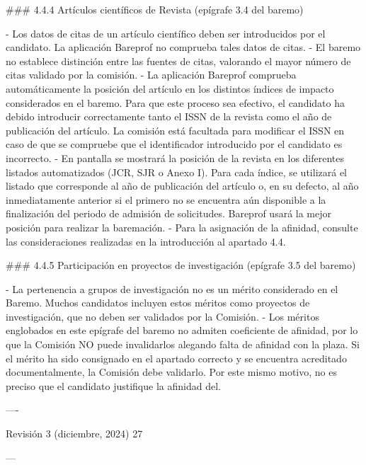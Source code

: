 \documentclass{article}
\begin{document}
\begin{itemize}
\begin{itemize}
\begin{scriptsize}
                  \#\#\# 4.4.4 Artículos científicos de Revista (epígrafe 3.4 del baremo)

                  - Los datos de citas de un artículo científico deben ser introducidos por el candidato. La aplicación Bareprof no comprueba tales datos de citas.
                  - El baremo no establece distinción entre las fuentes de citas, valorando el mayor número de citas validado por la comisión.
                  - La aplicación Bareprof comprueba automáticamente la posición del artículo en los distintos índices de impacto considerados en el baremo. Para que este proceso sea efectivo, el candidato ha debido introducir correctamente tanto el ISSN de la revista como el año de publicación del artículo. La comisión está facultada para modificar el ISSN en caso de que se compruebe que el identificador introducido por el candidato es incorrecto.
                  - En pantalla se mostrará la posición de la revista en los diferentes listados automatizados (JCR, SJR o Anexo I). Para cada índice, se utilizará el listado que corresponde al año de publicación del artículo o, en su defecto, al año inmediatamente anterior si el primero no se encuentra aún disponible a la finalización del periodo de admisión de solicitudes. Bareprof usará la mejor posición para realizar la baremación.
                  - Para la asignación de la afinidad, consulte las consideraciones realizadas en la introducción al apartado 4.4.

                  \#\#\# 4.4.5 Participación en proyectos de investigación (epígrafe 3.5 del baremo)

                  - La pertenencia a grupos de investigación no es un mérito considerado en el Baremo. Muchos candidatos incluyen estos méritos como proyectos de investigación, que no deben ser validados por la Comisión.
                  - Los méritos englobados en este epígrafe del baremo no admiten coeficiente de afinidad, por lo que la Comisión NO puede invalidarlos alegando falta de afinidad con la plaza. Si el mérito ha sido consignado en el apartado correcto y se encuentra acreditado documentalmente, la Comisión debe validarlo. Por este mismo motivo, no es preciso que el candidato justifique la afinidad del.

                  ----

                  Revisión 3 (diciembre, 2024) 27

                  ---


\end{scriptsize}
\end{itemize}
\end{itemize}
\end{document}
